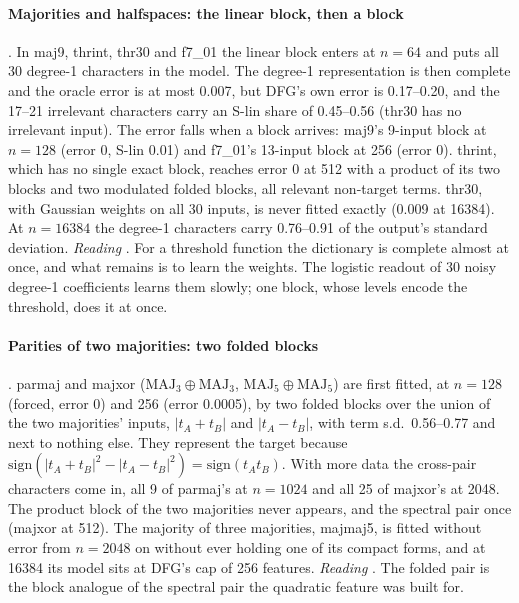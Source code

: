 \paragraph{Majorities and halfspaces: the linear block, then a block} . In maj9, thrint, thr30 and f7\_01 the linear block enters at $n=64$ and puts all 30 degree-1 characters in the model. The degree-1 representation is then complete and the oracle error is at most 0.007, but DFG's own error is 0.17--0.20, and the 17--21 irrelevant characters carry an S-lin share of 0.45--0.56 (thr30 has no irrelevant input). The error falls when a block arrives: maj9's 9-input block at $n=128$ (error 0, S-lin 0.01) and f7\_01's 13-input block at 256 (error 0). thrint, which has no single exact block, reaches error 0 at 512 with a product of its two blocks and two modulated folded blocks, all relevant non-target terms. thr30, with Gaussian weights on all 30 inputs, is never fitted exactly (0.009 at 16384). At $n=16384$ the degree-1 characters carry 0.76--0.91 of the output's standard deviation. \emph{Reading} . For a threshold function the dictionary is complete almost at once, and what remains is to learn the weights. The logistic readout of 30 noisy degree-1 coefficients learns them slowly; one block, whose levels encode the threshold, does it at once.

\paragraph{Parities of two majorities: two folded blocks} . parmaj and majxor ($\mathrm{MAJ}_3\oplus\mathrm{MAJ}_3$, $\mathrm{MAJ}_5\oplus\mathrm{MAJ}_5$) are first fitted, at $n=128$ (forced, error 0) and 256 (error 0.0005), by two folded blocks over the union of the two majorities' inputs, $|t_A+t_B|$ and $|t_A-t_B|$, with term s.d.\ 0.56--0.77 and next to nothing else. They represent the target because $\mathrm{sign}(|t_A+t_B|^2-|t_A-t_B|^2)=\mathrm{sign}(t_At_B)$. With more data the cross-pair characters come in, all 9 of parmaj's at $n=1024$ and all 25 of majxor's at 2048. The product block of the two majorities never appears, and the spectral pair once (majxor at 512). The majority of three majorities, majmaj5, is fitted without error from $n=2048$ on without ever holding one of its compact forms, and at 16384 its model sits at DFG's cap of 256 features. \emph{Reading} . The folded pair is the block analogue of the spectral pair the quadratic feature was built for.

